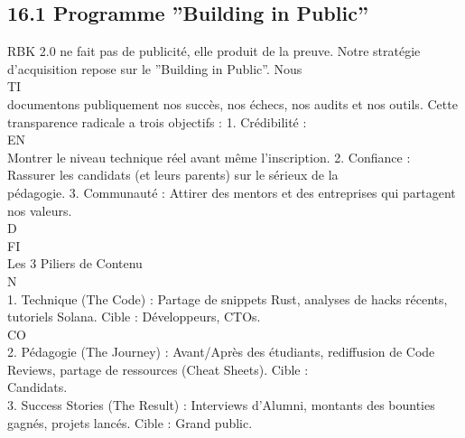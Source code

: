 \documentclass[12pt,landscape,a4paper]{article}
\begin{document}
\subsection{16.1 Programme ”Building in Public”}
RBK 2.0 ne fait pas de publicité, elle produit de la preuve. Notre stratégie d’acquisition repose sur le ”Building in Public”. Nous\\
\vspace{0.5em}
\vspace{0.5em}
\vspace{0.5em}
\vspace{0.5em}
TI\\
documentons publiquement nos succès, nos échecs, nos audits et nos outils. Cette transparence radicale a trois objectifs : 1. Crédibilité :\\
\vspace{0.5em}
\vspace{0.5em}
\vspace{0.5em}
\vspace{0.5em}
EN\\
Montrer le niveau technique réel avant même l’inscription. 2. Confiance : Rassurer les candidats (et leurs parents) sur le sérieux de la\\
pédagogie. 3. Communauté : Attirer des mentors et des entreprises qui partagent nos valeurs.\\
\vspace{0.5em}
\vspace{0.5em}
\vspace{0.5em}
\vspace{0.5em}
D\\
FI\\
Les 3 Piliers de Contenu\\
\vspace{0.5em}
N\\
1. Technique (The Code) : Partage de snippets Rust, analyses de hacks récents, tutoriels Solana. Cible : Développeurs, CTOs.\\
CO\\
2. Pédagogie (The Journey) : Avant/Après des étudiants, rediffusion de Code Reviews, partage de ressources (Cheat Sheets). Cible :\\
Candidats.\\
\vspace{0.5em}
3. Success Stories (The Result) : Interviews d’Alumni, montants des bounties gagnés, projets lancés. Cible : Grand public.\\
\vspace{0.5em}
\vspace{0.5em}
\end{document}

